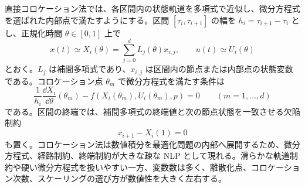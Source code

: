 直接コロケーション法では、各区間内の状態軌道を多項式で近似し、微分方程式を選ばれた内部点で満たすようにする。区間 $[\tau_i,\tau_{i+1}]$ の幅を $h_i=\tau_{i+1}-\tau_i$ とし、正規化時間 $\theta\in[0,1]$ 上で
\begin{equation}
  x(t)\simeq X_i(\theta)
  =\sum_{j=0}^{d}L_j(\theta)x_{i,j},
  \qquad
  u(t)\simeq U_i(\theta)
\end{equation}
とおく。$L_j$ は補間多項式であり、$x_{i,j}$ は区間内の節点または内部点の状態変数である。コロケーション点 $\theta_m$ で微分方程式を満たす条件は
\begin{equation}
  \frac{1}{h_i}\frac{\dd X_i}{\dd\theta}(\theta_m)
  -f(X_i(\theta_m),U_i(\theta_m),p)=0
  \qquad (m=1,\ldots,d)
\end{equation}
である。区間の終端では、補間多項式の終端値と次の節点状態を一致させる欠陥制約
\begin{equation}
  x_{i+1}-X_i(1)=0
\end{equation}
も置く。コロケーション法は数値積分を最適化問題の内部へ展開するため、微分方程式、経路制約、終端制約が大きな疎な NLP として現れる。滑らかな軌道制約や硬い微分方程式を扱いやすい一方、変数数は多く、離散化点、コロケーション次数、スケーリングの選び方が数値性を大きく左右する。

